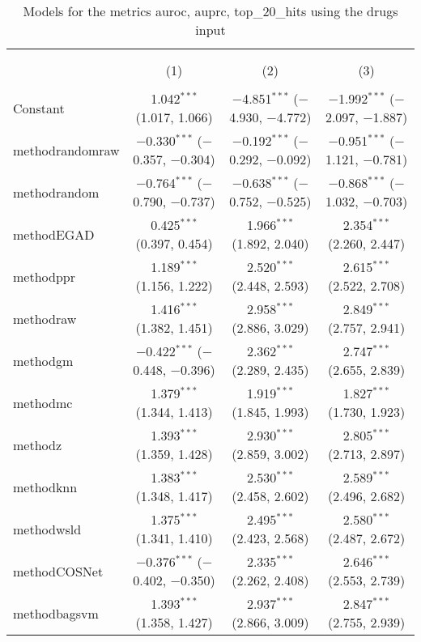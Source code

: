
\begin{table}[!htbp] \centering 
  \caption{Models for the metrics auroc, auprc, top_20_hits using the drugs input} 
  \label{} 
\begin{tabular}{@{\extracolsep{5pt}}lccc} 
\\[-1.8ex]\hline 
\hline \\[-1.8ex] 
\\[-1.8ex] & (1) & (2) & (3)\\ 
\hline \\[-1.8ex] 
 Constant & 1.042$^{***}$ (1.017, 1.066) & $-$4.851$^{***}$ ($-$4.930, $-$4.772) & $-$1.992$^{***}$ ($-$2.097, $-$1.887) \\ 
  methodrandomraw & $-$0.330$^{***}$ ($-$0.357, $-$0.304) & $-$0.192$^{***}$ ($-$0.292, $-$0.092) & $-$0.951$^{***}$ ($-$1.121, $-$0.781) \\ 
  methodrandom & $-$0.764$^{***}$ ($-$0.790, $-$0.737) & $-$0.638$^{***}$ ($-$0.752, $-$0.525) & $-$0.868$^{***}$ ($-$1.032, $-$0.703) \\ 
  methodEGAD & 0.425$^{***}$ (0.397, 0.454) & 1.966$^{***}$ (1.892, 2.040) & 2.354$^{***}$ (2.260, 2.447) \\ 
  methodppr & 1.189$^{***}$ (1.156, 1.222) & 2.520$^{***}$ (2.448, 2.593) & 2.615$^{***}$ (2.522, 2.708) \\ 
  methodraw & 1.416$^{***}$ (1.382, 1.451) & 2.958$^{***}$ (2.886, 3.029) & 2.849$^{***}$ (2.757, 2.941) \\ 
  methodgm & $-$0.422$^{***}$ ($-$0.448, $-$0.396) & 2.362$^{***}$ (2.289, 2.435) & 2.747$^{***}$ (2.655, 2.839) \\ 
  methodmc & 1.379$^{***}$ (1.344, 1.413) & 1.919$^{***}$ (1.845, 1.993) & 1.827$^{***}$ (1.730, 1.923) \\ 
  methodz & 1.393$^{***}$ (1.359, 1.428) & 2.930$^{***}$ (2.859, 3.002) & 2.805$^{***}$ (2.713, 2.897) \\ 
  methodknn & 1.383$^{***}$ (1.348, 1.417) & 2.530$^{***}$ (2.458, 2.602) & 2.589$^{***}$ (2.496, 2.682) \\ 
  methodwsld & 1.375$^{***}$ (1.341, 1.410) & 2.495$^{***}$ (2.423, 2.568) & 2.580$^{***}$ (2.487, 2.672) \\ 
  methodCOSNet & $-$0.376$^{***}$ ($-$0.402, $-$0.350) & 2.335$^{***}$ (2.262, 2.408) & 2.646$^{***}$ (2.553, 2.739) \\ 
  methodbagsvm & 1.393$^{***}$ (1.358, 1.427) & 2.937$^{***}$ (2.866, 3.009) & 2.847$^{***}$ (2.755, 2.939) \\ 

\end{tabular}
\end{table}

